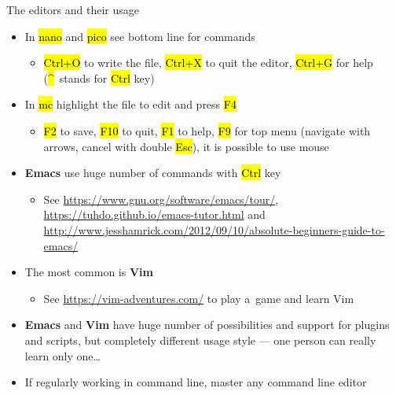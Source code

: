 \documentclass[compress, ucs, xelatex, 11pt, xcolor=svgnames, aspectratio=169,
	hyperref={
		bookmarks=true,
		unicode=true,
		colorlinks=true,
		pdftitle={Linux, command line and MetaCentrum},
		plainpages=false,
		pdfauthor={Vojtech Zeisek},
		pdfsubject={Course about use of Linux command line, writing shell scripts and using MetaCentrum of CESNET},
		pdfcreator={XeLaTeX},
		pdfkeywords={Linux, GNU, BASH, shell, command line, MetaCentrum},
		linkcolor=DarkRed, %
		anchorcolor=DarkBlue, %
		citecolor=Indigo, %
		filecolor=NavyBlue, %
		menucolor=DarkMagenta, %
		urlcolor=DarkBlue, %
		pdftex},
	url={hyphens, lowtilde} %
	]{beamer}
\renewcommand{\texttt}[1]{\hl{\ttfamily #1}}
\begin{document}
\begin{frame}{The editors and their usage}
	\begin{itemize}
		\item In \texttt{nano} and \texttt{pico} see bottom line for commands
		\begin{itemize}
			\item \texttt{Ctrl+O} to write the file, \texttt{Ctrl+X} to quit the editor, \texttt{Ctrl+G} for help (\texttt{\textasciicircum}~stands for \texttt{Ctrl} key)
		\end{itemize}
		\item In \texttt{mc} highlight the file to edit and press \texttt{F4}
		\begin{itemize}
			\item \texttt{F2} to save, \texttt{F10} to quit, \texttt{F1} to help, \texttt{F9} for top menu (navigate with arrows, cancel with double \texttt{Esc}), it is possible to use mouse
		\end{itemize}
		\item \textbf{Emacs} use huge number of commands with \texttt{Ctrl} key
		\begin{itemize}
			\item See \url{https://www.gnu.org/software/emacs/tour/}, \url{https://tuhdo.github.io/emacs-tutor.html} and \url{http://www.jesshamrick.com/2012/09/10/absolute-beginners-guide-to-emacs/}
		\end{itemize}
		\item The most common is \textbf{Vim}
		\begin{itemize}
			\item See \url{https://vim-adventures.com/} to play a~game and learn Vim
		\end{itemize}
		\item \textbf{Emacs} and \textbf{Vim} have huge number of possibilities and support for plugins and scripts, but completely different usage style --- one person can really learn only one\ldots
		\item If regularly working in command line, master any command line editor
	\end{itemize}
\end{frame}
\end{document}
